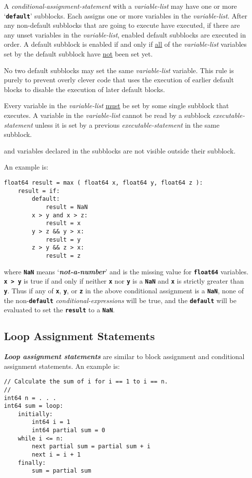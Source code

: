 \documentclass[12pt]{article}
\makeatletter
\newcommand{\TT}[1]{{\tt \bfseries #1}}
\newcommand{\key}[1]{{\bf \em #1}\index{#1}}
\newcommand{\ikey}[2]{{\bf \em #1}\index{#2}}
\newcommand{\ttkey}[1]{\TT{#1}\index{#1@{\tt #1}}}
\newenvironment{indpar}[1][0.3in]%
	{\begin{list}{}%
		     {\setlength{\itemsep}{0in}%
		      \setlength{\topsep}{0in}%
		      \setlength{\parsep}{1ex}%
		      \setlength{\labelwidth}{#1}%
		      \setlength{\leftmargin}{#1}%
		      \addtolength{\leftmargin}{\labelsep}}%
	 \item}%
	{\end{list}}
\makeatother
\begin{document}
A {\em conditional-assignment-statement} with a
{\em variable-list} may have one or
more `\ttkey{default}\TT{:}' subblocks.  Each assigns one or more
variables in the {\em variable-list}.  After any non-default subblocks
that are going to execute have executed, if there are any unset
variables in the {\em variable-list}, enabled default subblocks are executed
in order.  A default subblock is enabled if and
only if \underline{all} of the
{\em variable-list} variables set by the default subblock have
\underline{not} been set yet.

No two default subblocks may set the same {\em variable-list}
variable.  This rule is purely to prevent overly clever code that
uses the execution of earlier default blocks to disable the
execution of later default blocks.

Every variable in the {\em variable-list} \underline{must} be set by some
single subblock that executes.  A variable in the
{\em variable-list} cannot be read by a subblock {\em executable-statement}
unless it is set by a previous {\em executable-statement} in the
same subblock.

and variables declared in the subblocks are not visible outside their
subblock.

An example is:
\begin{indpar}\begin{verbatim}
float64 result = max ( float64 x, float64 y, float64 z ):
    result = if:
        default:
            result = NaN
        x > y and x > z:
            result = x
        y > z && y > x:
            result = y
        z > y && z > x:
            result = z
\end{verbatim}\end{indpar}

where \TT{NaN} means `\key{not-a-number}' and is the missing
value for \TT{float64} variables.  \TT{x~>~y} is true if
and only if neither \TT{x} nor \TT{y} is a \TT{NaN} and
\TT{x} is strictly greater than \TT{y}.  Thus if any of
\TT{x}, \TT{y}, or \TT{z} in the above conditional assignment
is a \TT{NaN}, none of the non-\TT{default} {\em conditional-expressions}
will be true, and the \TT{default} will be evaluated to set
the \TT{result} to a \TT{NaN}.

\subsection{Loop Assignment Statements}
\label{LOOP-ASSIGNMENT-STATEMENTS}

\ikey{Loop assignment statements}{loop assignment}
are similar to block assignment
and conditional assignment statements.  An example is:
\begin{indpar}\begin{verbatim}
// Calculate the sum of i for i == 1 to i == n.
//
int64 n = . . .
int64 sum = loop:
    initially:
        int64 i = 1
        int64 partial sum = 0
    while i <= n:
        next partial sum = partial sum + i
        next i = i + 1
    finally:
        sum = partial sum
\end{verbatim}\end{indpar}
\end{document}
